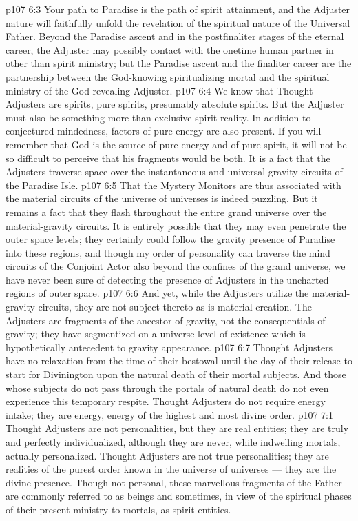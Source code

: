 \vs p107 6:3 Your path to Paradise is the path of spirit attainment, and the Adjuster nature will faithfully unfold the revelation of the spiritual nature of the Universal Father. Beyond the Paradise ascent and in the postfinaliter stages of the eternal career, the Adjuster may possibly contact with the onetime human partner in other than spirit ministry; but the Paradise ascent and the finaliter career are the partnership between the God\hyp{}knowing spiritualizing mortal and the spiritual ministry of the God\hyp{}revealing Adjuster.
\vs p107 6:4 \pc We know that Thought Adjusters are spirits, pure spirits, presumably absolute spirits. But the Adjuster must also be something more than exclusive spirit reality. In addition to conjectured mindedness, factors of pure energy are also present. If you will remember that God is the source of pure energy and of pure spirit, it will not be so difficult to perceive that his fragments would be both. It is a fact that the Adjusters traverse space over the instantaneous and universal gravity circuits of the Paradise Isle.
\vs p107 6:5 That the Mystery Monitors are thus associated with the material circuits of the universe of universes is indeed puzzling. But it remains a fact that they flash throughout the entire grand universe over the material\hyp{}gravity circuits. It is entirely possible that they may even penetrate the outer space levels; they certainly could follow the gravity presence of Paradise into these regions, and though my order of personality can traverse the mind circuits of the Conjoint Actor also beyond the confines of the grand universe, we have never been sure of detecting the presence of Adjusters in the uncharted regions of outer space.
\vs p107 6:6 And yet, while the Adjusters utilize the material\hyp{}gravity circuits, they are not subject thereto as is material creation. The Adjusters are fragments of the ancestor of gravity, not the consequentials of gravity; they have segmentized on a universe level of existence which is hypothetically antecedent to gravity appearance.
\vs p107 6:7 Thought Adjusters have no relaxation from the time of their bestowal until the day of their release to start for Divinington upon the natural death of their mortal subjects. And those whose subjects do not pass through the portals of natural death do not even experience this temporary respite. Thought Adjusters do not require energy intake; they are energy, energy of the highest and most divine order.
\vs p107 7:1 Thought Adjusters are not personalities, but they are real entities; they are truly and perfectly individualized, although they are never, while indwelling mortals, actually personalized. Thought Adjusters are not true personalities; they are  realities of the purest order known in the universe of universes --- they are the divine presence. Though not personal, these marvellous fragments of the Father are commonly referred to as beings and sometimes, in view of the spiritual phases of their present ministry to mortals, as spirit entities.
